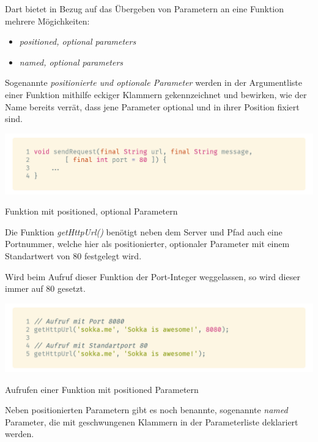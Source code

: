 \newpage

Dart bietet in Bezug auf das Übergeben von Parametern an eine Funktion mehrere Mögichkeiten:

\begin{itemize}
    \item \textit{positioned, optional parameters}
    \item \textit{named, optional parameters}
\end{itemize}

Sogenannte \textit{positionierte und optionale Parameter} werden in der Argumentliste einer Funktion mithilfe eckiger Klammern gekennzeichnet und bewirken, wie der Name bereits verrät, dass jene Parameter optional und in ihrer Position fixiert sind.

\begin{code}
    \centering
    \includegraphics[width=1\textwidth]{images/Dart/theory/dartPositionedArgumentsFunction.png}
    \caption{Funktion mit positioned, optional Parametern}
\end{code}

Die Funktion \textit{getHttpUrl()} benötigt neben dem Server und Pfad auch eine Portnummer, welche hier als positionierter, optionaler Parameter mit einem Standartwert von 80 festgelegt wird.

Wird beim Aufruf dieser Funktion der Port-Integer weggelassen, so wird dieser immer auf 80 gesetzt.

\begin{code}
    \centering
    \includegraphics[width=1\textwidth]{images/Dart/theory/dartCallPositionedFunction.png}
    \caption{Aufrufen einer Funktion mit positioned Parametern}
\end{code}

\newpage

Neben positionierten Parametern gibt es noch \glqq benannte\grqq , sogenannte \textit{named} Parameter, die mit geschwungenen Klammern in der Parameterliste deklariert werden.

